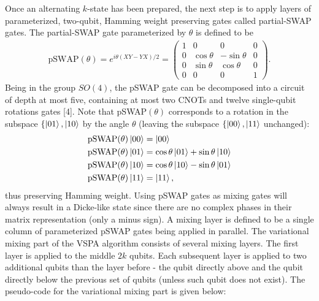 \documentclass[10pt]{article}
\begin{document}
Once an alternating $k$-state has been prepared, the next step is to apply layers of parameterized, two-qubit, Hamming weight preserving gates called partial-SWAP gates. The partial-SWAP gate parameterized by $\theta$ is defined to be
\begin{align}
\text{pSWAP}(\theta)
=
e^{i\theta(XY-YX)/2}
=
\begin{pmatrix}
1 & 0 & 0 & 0 \\
0 & \cos\theta & -\sin\theta & 0 \\
0 & \sin\theta & \cos\theta & 0 \\
0 & 0 & 0 & 1
\end{pmatrix}
.\end{align}
Being in the group $SO(4)$, the pSWAP gate can be decomposed into a circuit of depth at most five, containing at most two CNOTs and twelve single-qubit rotations gates [4]. Note that pSWAP$(\theta)$ corresponds to a rotation in the subspace $\{\ket{01},\ket{10}$ by the angle $\theta$ (leaving the subspace $\{\ket{00},\ket{11}$ unchanged):
\begin{align}
\text{pSWAP}(\theta)\ket{00} &= \ket{00}
\\
\text{pSWAP}(\theta)\ket{01} &= \cos\theta\ket{01} + \sin\theta\ket{10} 
\\
\text{pSWAP}(\theta)\ket{10} &= \cos\theta\ket{10} - \sin\theta\ket{01} 
\\
\text{pSWAP}(\theta)\ket{11} &= \ket{11}
,\end{align}
thus preserving Hamming weight. Using pSWAP gates as mixing gates will always result in a Dicke-like state since there are no complex phases in their matrix representation (only a minus sign). A mixing layer is defined to be a single column of parameterized pSWAP gates being applied in parallel. The variational mixing part of the VSPA algorithm consists of several mixing layers. The first layer is applied to the middle $2k$ qubits. Each subsequent layer is applied to two additional qubits than the layer before - the qubit directly above and the qubit directly below the previous set of qubits (unless such qubit does not exist). The pseudo-code for the variational mixing part is given below:
\end{document}
